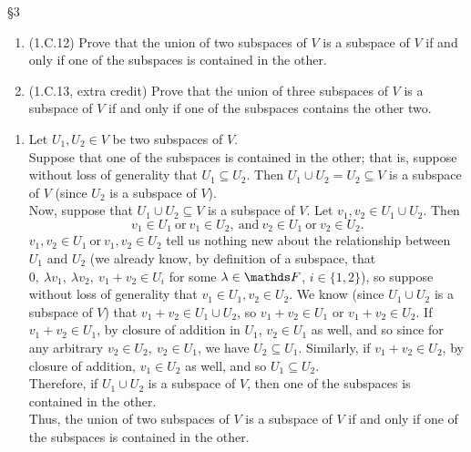 \documentclass{homework}
\begin{document}
\begin{problem}{\S 3}
  \begin{enumerate}[label=(\alph*)]
    \item (1.C.12) Prove that the union of two subspaces of $V$ is a subspace of $V$ if and only if
      one of the subspaces is contained in the other.
    \item (1.C.13, extra credit) Prove that the union of three subspaces of $V$ is a subspace of $V$ 
      if and only if one of the subspaces contains the other two.
  \end{enumerate}
\end{problem}
\begin{solution}
  \begin{enumerate}[label=(\alph*)]
    \item 
  Let $U_1,U_2\in V$ be two subspaces of $V$.\\

  Suppose that one of the subspaces is contained in the other; that is, suppose without loss of
  generality that $ U_1\subseteq U_2$. Then $ U_1\cup U_2=U_2\subseteq V$ is a subspace of $V$ 
  (since $ U_2$ is a subspace of $V$).\\

  Now, suppose that $ U_1\cup U_2\subseteq V$ is a subspace of $V$. Let $ v_1,v_2\in U_1\cup U_2$.
  Then \[
    v_1\in U_1 ~\text{or}~v_1\in U_2,~\text{and}~v_2\in U_1~\text{or}~v_2\in U_2
  .\] $ v_1,v_2\in U_1~\text{or}~v_1,v_2\in U_2$ tell us nothing new about the relationship between
  $ U_1$ and $U_2$ (we already know, by definition of a subspace, that $0,\ \lambda v_1,\ \lambda
  v_2,\ v_1+v_2\in U_i$ for some $\lambda\in \F$, $i\in \{ 1,2 \}$), so suppose without loss of
  generality that $v_1\in U_1,v_2\in U_2$. We know (since $ U_1\cup U_2$ is a subspace of $V$) that
  $v_1+v_2\in U_1\cup U_2$, so $ v_1+v_2\in U_1$ or $ v_1+v_2\in U_2$. If $ v_1+v_2\in U_1$, by
  closure of addition in $ U_1$, $ v_2\in U_1$ as well, and so since for any arbitrary $v_2\in U_2,\
  v_2\in U_1$, we have $ U_2\subseteq U_1$. Similarly, if $ v_1+v_2\in U_2$, by closure of addition, $v_1\in
  U_2$ as well, and so $ U_1\subseteq U_2$. \\
  Therefore, if $ U_1\cup U_2$ is a subspace of $V$, then one of the subspaces is contained in the
  other.\\

  Thus, the union of two subspaces of $V$ is a subspace of $V$ if and only if one of the subspaces
  is contained in the other.
  \end{enumerate}
\end{solution}
\end{document}
